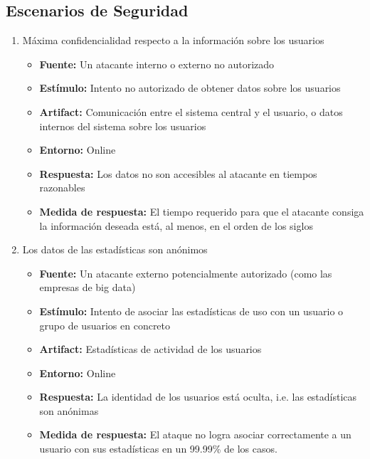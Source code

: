 \subsection{Escenarios de Seguridad}
\begin{enumerate}
\item Máxima confidencialidad respecto a la información sobre los usuarios
  \begin{itemize}
    \item \textbf{\textbf{Fuente:}} Un atacante interno o externo no autorizado
    \item \textbf{\textbf{Estímulo:}} Intento no autorizado de obtener datos sobre los usuarios
    \item \textbf{\textbf{Artifact:}} Comunicación entre el sistema central y el usuario, o datos internos del sistema sobre los usuarios
    \item \textbf{\textbf{Entorno:}} Online
    \item \textbf{\textbf{Respuesta:}} Los datos no son accesibles al atacante en tiempos razonables
    \item \textbf{\textbf{Medida de respuesta:}} El tiempo requerido para que el atacante consiga la información deseada está, al menos, en el orden de los siglos
  \end{itemize}
\item Los datos de las estadísticas son anónimos
  \begin{itemize}
    \item \textbf{\textbf{Fuente:}} Un atacante externo potencialmente autorizado (como las empresas de big data)
    \item \textbf{\textbf{Estímulo:}} Intento de asociar las estadísticas de uso con un usuario o grupo de usuarios en concreto
    \item \textbf{\textbf{Artifact:}} Estadísticas de actividad de los usuarios
    \item \textbf{\textbf{Entorno:}} Online
    \item \textbf{\textbf{Respuesta:}} La identidad de los usuarios está oculta, i.e. las estadísticas son anónimas
    \item \textbf{\textbf{Medida de respuesta:}} El ataque no logra asociar correctamente a un usuario con sus estadísticas en un 99.99\% de los casos.
  \end{itemize}


\end{enumerate}
